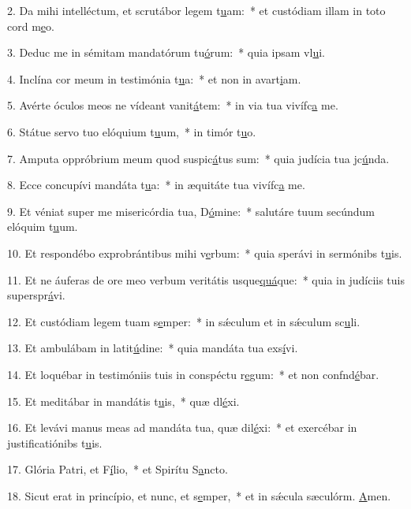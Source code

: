2. Da mihi intelléctum, et scrutábor legem t\uline{u}am:~* et custódiam illam in toto cord m\uline{e}o.\par 
3. Deduc me in sémitam mandatórum tu\uline{ó}rum:~* quia ipsam vl\uline{u}i.\par 
4. Inclína cor meum in testimónia t\uline{u}a:~* et non in avart\uline{i}am.\par 
5. Avérte óculos meos ne vídeant vanit\uline{á}tem:~* in via tua vivífc\uline{a} me.\par 
6. Státue servo tuo elóquium t\uline{u}um,~* in timór t\uline{u}o.\par 
7. Amputa oppróbrium meum quod suspic\uline{á}tus sum:~* quia judícia tua jc\uline{ú}nda.\par 
8. Ecce concupívi mandáta t\uline{u}a:~* in æquitáte tua vivífc\uline{a} me.\par 
9. Et véniat super me misericórdia tua, D\uline{ó}mine:~* salutáre tuum secúndum elóquim t\uline{u}um.\par 
10. Et respondébo exprobrántibus mihi v\uline{e}rbum:~* quia sperávi in sermónibs t\uline{u}is.\par 
11. Et ne áuferas de ore meo verbum veritátis usque\uline{quá}que:~* quia in judíciis tuis superspr\uline{á}vi.\par 
12. Et custódiam legem tuam s\uline{e}mper:~* in sǽculum et in sǽculum sc\uline{u}li.\par 
13. Et ambulábam in latit\uline{ú}dine:~* quia mandáta tua exs\uline{í}vi.\par 
14. Et loquébar in testimóniis tuis in conspéctu r\uline{e}gum:~* et non confnd\uline{é}bar.\par 
15. Et meditábar in mandátis t\uline{u}is,~* quæ dl\uline{é}xi.\par 
16. Et levávi manus meas ad mandáta tua, quæ dil\uline{é}xi:~* et exercébar in justificatiónibs t\uline{u}is.\par 
17. Glória Patri, et F\uline{í}lio,~* et Spirítu S\uline{a}ncto.\par 
18. Sicut erat in princípio, et nunc, et s\uline{e}mper,~* et in sǽcula sæculórm. \uline{A}men.\par 
